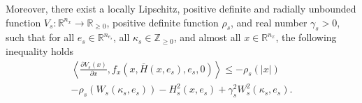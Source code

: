 \begin{assum}
%
Moreover, there exist a locally Lipschitz, positive definite and radially unbounded function ${V_s}: \mathbb{R}^{n_x} \to \mathbb{R}_{\geq 0}$, positive definite function $\rho_s $, and real number $\gamma_s > 0$, such that for all $e_s \in \mathbb{R}^{n_{e_s}}$, all $\kappa_s \in \mathbb{Z}_{\geq 0}$, and almost all $x\in \mathbb{R}^{n_x}$, the following inequality holds
\begin{multline}
    \left< \tfrac{\partial {V_s}(x)}{\partial x},f_x(x,\overline{H}(x,e_s),e_s, 0) \right> \leq - \rho_s(|x|) 
    \\
     - \rho_s\left(W_s(\kappa_s, e_s)\right) - H_s^2(x,e_s) + \gamma_s^2 W_s^2(\kappa_s, e_s). 
    \label{eqn: NCS Vs flow}
\end{multline}
\label{Assumption reduced model}
\end{assum}
\vspace{-0.5cm}
%
